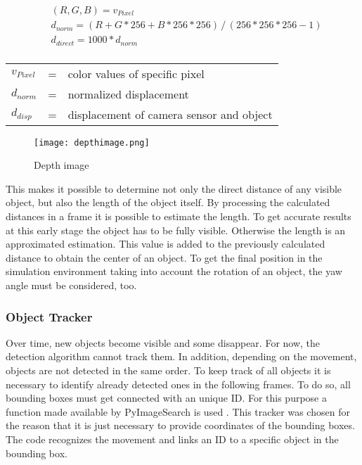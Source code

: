 \begin{equation}
	\label{eq:distance}
	\begin{aligned}
		& (R, G, B) = v_{Pixel}\\
		& d_{norm} = (R+G*256+B*256*256)\,/\,(256*256*256-1)\\
		& d_{direct} = 1000 * d_{norm}\\
	\end{aligned}
\end{equation}
\begin{table}[!h]
	\begin{center}
		\begin{tabular}{l c l}
			$v_{Pixel}$ & = & color values of specific pixel\\
			$d_{norm}$ & = &  normalized displacement\\
			$d_{disp}$ & = & displacement of camera sensor and object\\
		\end{tabular}
	\end{center}
\end{table}


\begin{figure}[b]
	\centering
	\texttt{[image: depthimage.png]}
	\caption{Depth image}
	\label{fig:depth image}
\end{figure}

This makes it possible to determine not only the direct distance of any visible object, but also the length of the object itself. By processing the calculated distances in a frame it is possible to estimate the length. To get accurate results at this early stage the object has to be fully visible. Otherwise the length is an approximated estimation. 
This value is added to the previously calculated distance to obtain the center of an object. To get the final position in the simulation environment taking into account the rotation of an object, the yaw angle must be considered, too.\\

\subsubsection{Object Tracker}
Over time, new objects become visible and some disappear. For now, the detection algorithm cannot track them. In addition, depending on the movement, objects are not detected in the same order. To keep track of all objects it is necessary to identify already detected ones in the following frames. To do so, all bounding boxes must get connected with an unique \ac{ID}. For this purpose a function made available by PyImageSearch is used \cite{Tracker}. This tracker was chosen for the reason that it is just necessary to provide coordinates of the bounding boxes. The code recognizes the movement and links an ID to a specific object in the bounding box.\\